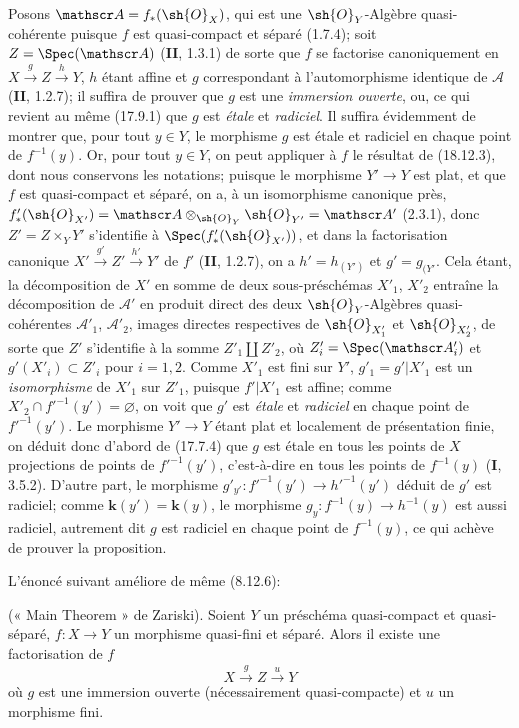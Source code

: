 Posons $\mathscr A=f_*(\sh{O}_X)$, qui est une $\sh{O}_Y$-Algèbre quasi-cohérente puisque $f$ est quasi-compact et séparé (1.7.4); soit $Z=\Spec(\mathscr A)$ (\textbf{II}, 1.3.1) de sorte que $f$ se factorise canoniquement en $X\xrightarrow{g}Z\xrightarrow{h}Y$, $h$ étant affine et $g$ correspondant à l'automorphisme identique de $\mathscr A$ (\textbf{II}, 1.2.7); il suffira de prouver que $g$ est une \emph{immersion ouverte}, ou, ce qui revient au même (17.9.1) que $g$ est \emph{étale} et \emph{radiciel}. Il suffira évidemment de montrer que, pour tout $y\in Y$, le morphisme $g$ est étale et radiciel en chaque point de $f^{-1}(y)$. Or, pour tout $y\in Y$, on peut appliquer à $f$ le résultat de (18.12.3), dont nous conservons les notations; puisque le morphisme $Y'\to Y$ est plat, et que $f$ est quasi-compact et séparé, on a, à un isomorphisme canonique près, $f'_*(\sh{O}_{X'})=\mathscr A\otimes_{\sh{O}_Y}\sh{O}_{Y'}=\mathscr A'$ (2.3.1), donc $Z'=Z\times_Y Y'$ s'identifie à $\Spec(f'_*(\sh{O}_{X'}))$, et dans la factorisation canonique $X'\xrightarrow{g'}Z'\xrightarrow{h'}Y'$ de $f'$ (\textbf{II}, 1.2.7), on a $h'=h_{(Y')}$ et $g'=g_{(Y'}$. Cela étant, la décomposition de $X'$ en somme de deux sous-préschémas $X'_1$, $X'_2$ entraîne la décomposition de $\mathscr A'$ en produit direct des deux $\sh{O}_Y$-Algèbres quasi-cohérentes $\mathscr A'_1$, $\mathscr A'_2$, images directes respectives de $\sh{O}_{X'_1}$ et $\sh{O}_{X'_2}$, de sorte que $Z'$ s'identifie à la somme $Z'_1\amalg Z'_2$, où $Z'_i=\Spec(\mathscr A'_i)$ et $g'(X'_i)\subset Z'_i$ pour $i=1,2$. Comme $X'_1$ est fini sur $Y'$, $g'_1=g'|X'_1$ est un \emph{isomorphisme} de $X'_1$ sur $Z'_1$, puisque $f'|X'_1$ est affine; comme $X'_2\cap f'^{-1}(y')=\varnothing$, on voit que $g'$ est \emph{étale} et \emph{radiciel} en chaque point de $f'^{-1}(y')$. Le morphisme $Y'\to Y$ étant plat et localement de présentation finie, on déduit donc d'abord de (17.7.4) que $g$ est étale en tous les points de $X$ projections de points de $f'^{-1}(y')$, c'est-à-dire en tous les points de $f^{-1}(y)$ (\textbf{I}, 3.5.2). D'autre part, le morphisme $g'_{y'}:f'^{-1}(y')\longrightarrow h'^{-1}(y')$ déduit de $g'$ est radiciel; comme $\boldsymbol{k}(y')=\boldsymbol{k}(y)$, le morphisme $g_y:f^{-1}(y)\to h^{-1}(y)$ est aussi radiciel, autrement dit $g$ est radiciel en chaque point de $f^{-1}(y)$, ce qui achève de prouver la proposition.

L'énoncé suivant améliore de même (8.12.6):

\begin{corollary}[18.12.13]
\label{IV.18.12.13}
(« Main Theorem » de Zariski). Soient $Y$ un préschéma quasi-compact et quasi-séparé, $f:X\to Y$ un morphisme quasi-fini et séparé. Alors il existe une factorisation de $f$
\[
  X\xrightarrow{g}Z\xrightarrow{u}Y
\]
où $g$ est une immersion ouverte (nécessairement quasi-compacte) et $u$ un morphisme fini.
\end{corollary}

